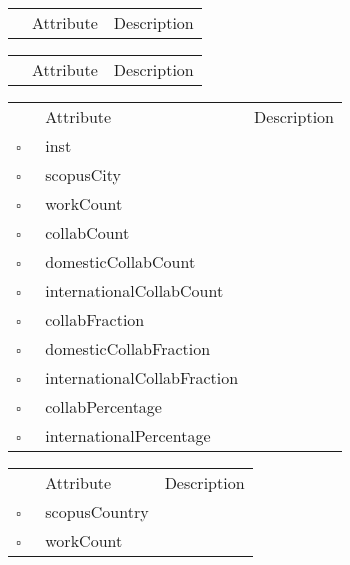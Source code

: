 \begin{table}
\caption{Scenario  This class describes the dataset for the application. Typically there is a single instance of this class in the application at all times.}

\begin{longtable}{llp{8cm}}
& Attribute & Description \\
\end{longtable}
\label{attr:Scenario}
\end{table}

\begin{table}
\caption{School  }

\begin{longtable}{llp{8cm}}
& Attribute & Description \\
\end{longtable}
\label{attr:School}
\end{table}

\clearpage
\begin{table}
\caption{ScopusAffiliation  }

\begin{longtable}{llp{8cm}}
& Attribute & Description \\
$\square$\ & inst &  \\
$\square$\ & scopusCity &  \\
$\square$\ & workCount &  \\
$\square$\ & collabCount &  \\
$\square$\ & domesticCollabCount &  \\
$\square$\ & internationalCollabCount &  \\
$\square$\ & collabFraction &  \\
$\square$\ & domesticCollabFraction &  \\
$\square$\ & internationalCollabFraction &  \\
$\square$\ & collabPercentage &  \\
$\square$\ & internationalPercentage &  \\
\end{longtable}
\label{attr:ScopusAffiliation}
\end{table}

\begin{table}
\caption{ScopusCity  }

\begin{longtable}{llp{8cm}}
& Attribute & Description \\
$\square$\ & scopusCountry &  \\
$\square$\ & workCount &  \\
\end{longtable}
\label{attr:ScopusCity}
\end{table}

